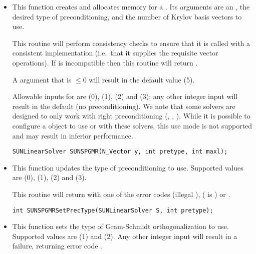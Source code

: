 \begin{itemize}


\item {}

  This function creates and allocates memory for a {\spgmr}
  .  Its arguments are an {\nvector}, the desired
  type of preconditioning, and the number of Krylov basis vectors to use.

  This routine will perform consistency checks to ensure that it is
  called with a consistent {\nvector} implementation (i.e.~that it
  supplies the requisite vector operations).  If  is
  incompatible then this routine will return .

  A  argument that is $\le0$ will result in the default
  value (5).

  Allowable inputs for  are  (0),
   (1),  (2) and  (3);
  any other integer input will result in the default (no
  preconditioning).  We note that some {\sundials} solvers are
  designed to only work with right preconditioning ({\kinsol}, {\ida},
  {\idas}).  While it is possible to configure a {\sunlinsolspgmr}
  object to use  or  with these solvers,
  this use mode is not supported and may result in inferior
  performance.

  \verb|SUNLinearSolver SUNSPGMR(N_Vector y, int pretype, int maxl);|


\item {}

  This function updates the type of preconditioning to use.  Supported
  values are  (0),  (1),
   (2) and  (3).  

  This routine will return with one of the error codes
   (illegal ), 
  ( is ) or .
  
  \verb|int SUNSPGMRSetPrecType(SUNLinearSolver S, int pretype);|


\item {}

  This function sets the type of Gram-Schmidt orthogonalization to
  use.  Supported values are  (1) and
   (2).  Any other integer input will result in a
  failure, returning error code .


\end{itemize}
